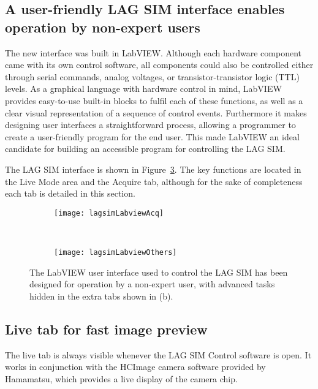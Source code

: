 \subsection{A user-friendly LAG SIM interface enables operation by non-expert users}
The new interface was built in LabVIEW. 
Although each hardware component came with its own control software, all components could also be controlled either through serial commands, analog voltages, or transistor-transistor logic (TTL) levels. 
As a graphical language with hardware control in mind, LabVIEW provides easy-to-use built-in blocks to fulfil each of these functions, as well as a clear visual representation of a sequence of control events.
Furthermore it makes designing user interfaces a straightforward process, allowing a programmer to create a user-friendly program for the end user. 
This made LabVIEW an ideal candidate for building an accessible program for controlling the LAG SIM.

The LAG SIM interface is shown in Figure~\ref{fig:lagsimLabview}.
The key functions are located in the Live Mode area and the Acquire tab, although for the sake of completeness each tab is detailed in this section. 

\begin{figure}[p]
\centering
\begin{subfigure}[b]{0.6\textwidth}
	\texttt{[image: lagsimLabviewAcq]}
	\caption{}\label{fig:fpbLabviewAcq}
\end{subfigure}

~\newline
\begin{subfigure}[b]{1.0\textwidth}
	\texttt{[image: lagsimLabviewOthers]}
	\caption{}\label{fig:fpbLabviewTabs}
\end{subfigure}
\caption[LAG SIM: The LabVIEW user interface for controlling LAG SIM is designed for operation by non-expert users]{The LabVIEW user interface used to control the LAG SIM has been designed for operation by a non-expert user, with advanced tasks hidden in the extra tabs shown in (b). } %
\label{fig:lagsimLabview}
\end{figure}

\subsection{Live tab for fast image preview} \label{sec:lagsimLive}
The live tab is always visible whenever the LAG SIM Control software is open. 
It works in conjunction with the HCImage camera software provided by Hamamatsu, which provides a live display of the camera chip. 

